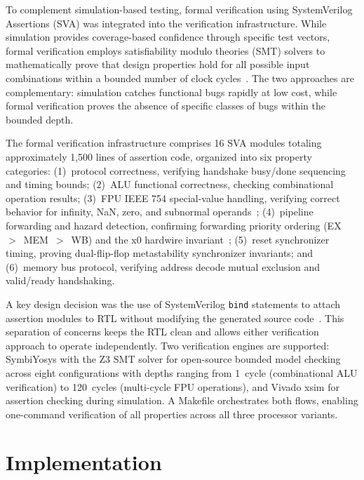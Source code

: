 \documentclass[conference]{IEEEtran}
\begin{document}
To complement simulation-based testing, formal verification using SystemVerilog Assertions (SVA) was integrated into the verification infrastructure. While simulation provides coverage-based confidence through specific test vectors, formal verification employs satisfiability modulo theories (SMT) solvers to mathematically prove that design properties hold for all possible input combinations within a bounded number of clock cycles~\cite{wolf2016symbiyosys}. The two approaches are complementary: simulation catches functional bugs rapidly at low cost, while formal verification proves the absence of specific classes of bugs within the bounded depth.

The formal verification infrastructure comprises 16 SVA modules totaling approximately 1,500 lines of assertion code, organized into six property categories: (1)~protocol correctness, verifying handshake busy/done sequencing and timing bounds; (2)~ALU functional correctness, checking combinational operation results; (3)~FPU IEEE 754 special-value handling, verifying correct behavior for infinity, NaN, zero, and subnormal operands~\cite{ieee754_2019}; (4)~pipeline forwarding and hazard detection, confirming forwarding priority ordering (EX~$>$~MEM~$>$~WB) and the x0 hardwire invariant~\cite{waterman2019riscv}; (5)~reset synchronizer timing, proving dual-flip-flop metastability synchronizer invariants; and (6)~memory bus protocol, verifying address decode mutual exclusion and valid/ready handshaking.

A key design decision was the use of SystemVerilog \texttt{bind} statements to attach assertion modules to RTL without modifying the generated source code~\cite{ieee1800_2017}. This separation of concerns keeps the RTL clean and allows either verification approach to operate independently. Two verification engines are supported: SymbiYosys with the Z3 SMT solver for open-source bounded model checking across eight configurations with depths ranging from 1~cycle (combinational ALU verification) to 120~cycles (multi-cycle FPU operations), and Vivado xsim for assertion checking during simulation. A Makefile orchestrates both flows, enabling one-command verification of all properties across all three processor variants.

\section{Implementation}
\end{document}
